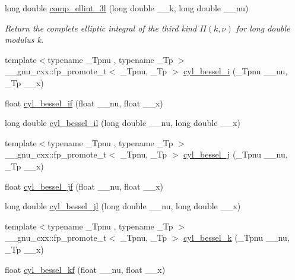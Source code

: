 \begin{DoxyCompactItemize}
long double \hyperlink{group__mathsf__std_ga1ca081fee102cd0d4d6b091285e495e5}{comp\+\_\+ellint\+\_\+3l} (long double \+\_\+\+\_\+k, long double \+\_\+\+\_\+nu)
\begin{DoxyCompactList}\small\item\em Return the complete elliptic integral of the third kind $ \Pi(k,\nu) $ for {\ttfamily long double} modulus {\ttfamily k}. \end{DoxyCompactList}\item 
{\footnotesize template$<$typename \+\_\+\+Tpnu , typename \+\_\+\+Tp $>$ }\\\+\_\+\+\_\+gnu\+\_\+cxx\+::fp\+\_\+promote\+\_\+t$<$ \+\_\+\+Tpnu, \+\_\+\+Tp $>$ \hyperlink{group__mathsf__std_ga29504b6008798072b0b8d6ea5a50ec60}{cyl\+\_\+bessel\+\_\+i} (\+\_\+\+Tpnu \+\_\+\+\_\+nu, \+\_\+\+Tp \+\_\+\+\_\+x)
\item 
float \hyperlink{group__mathsf__std_gaaf738427d4da0bda66bc2274dfb853a7}{cyl\+\_\+bessel\+\_\+if} (float \+\_\+\+\_\+nu, float \+\_\+\+\_\+x)
\item 
long double \hyperlink{group__mathsf__std_gab7962629216d03efb8ecaa3f70c6878f}{cyl\+\_\+bessel\+\_\+il} (long double \+\_\+\+\_\+nu, long double \+\_\+\+\_\+x)
\item 
{\footnotesize template$<$typename \+\_\+\+Tpnu , typename \+\_\+\+Tp $>$ }\\\+\_\+\+\_\+gnu\+\_\+cxx\+::fp\+\_\+promote\+\_\+t$<$ \+\_\+\+Tpnu, \+\_\+\+Tp $>$ \hyperlink{group__mathsf__std_ga644f7eb975809674db88768f2f115744}{cyl\+\_\+bessel\+\_\+j} (\+\_\+\+Tpnu \+\_\+\+\_\+nu, \+\_\+\+Tp \+\_\+\+\_\+x)
\item 
float \hyperlink{group__mathsf__std_ga15731a7bccd6351d28353e3c4c2a2d23}{cyl\+\_\+bessel\+\_\+jf} (float \+\_\+\+\_\+nu, float \+\_\+\+\_\+x)
\item 
long double \hyperlink{group__mathsf__std_gade8e94a80520a8b628b2d658755b25c0}{cyl\+\_\+bessel\+\_\+jl} (long double \+\_\+\+\_\+nu, long double \+\_\+\+\_\+x)
\item 
{\footnotesize template$<$typename \+\_\+\+Tpnu , typename \+\_\+\+Tp $>$ }\\\+\_\+\+\_\+gnu\+\_\+cxx\+::fp\+\_\+promote\+\_\+t$<$ \+\_\+\+Tpnu, \+\_\+\+Tp $>$ \hyperlink{group__mathsf__std_gac73d664b8e7ceba7f8e786c93e97a084}{cyl\+\_\+bessel\+\_\+k} (\+\_\+\+Tpnu \+\_\+\+\_\+nu, \+\_\+\+Tp \+\_\+\+\_\+x)
\item 
float \hyperlink{group__mathsf__std_ga1f50047f9aab0ec8b1a1615fe9fbe32f}{cyl\+\_\+bessel\+\_\+kf} (float \+\_\+\+\_\+nu, float \+\_\+\+\_\+x)

\end{DoxyCompactItemize}
